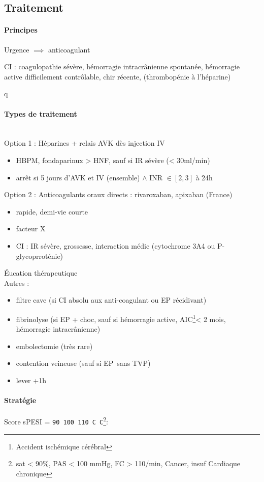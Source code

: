 \documentclass{article}
\begin{document}
\subsection{Traitement}
\paragraph{Principes}
Urgence \skull $\implies$ anticoagulant

CI : coagulopathie sévère, hémorragie intracrânienne spontanée, hémorragie
active difficilement contrôlable, chir récente, (thrombopénie à l'héparine)

q\paragraph{Types de traitement}\mbox{}\\
Option 1 : Héparines + relais AVK dès injection IV
\begin{itemize}
\item HBPM, fondaparinux > HNF, sauf si IR sévère (< 30ml/min)
\item arrêt si 5 jours d'AVK et IV (ensemble) $\wedge$ INR $\in [2,3]$ à 24h
\end{itemize}
Option 2 : Anticoagulants oraux directs : rivaroxaban, apixaban (France)
\begin{itemize}
\item rapide, demi-vie courte
\item facteur X
\item CI : IR sévère, grossesse, interaction médic (cytochrome 3A4 ou
  P-glycoprroténie)
\end{itemize}
Éucation thérapeutique\\
Autres :
\begin{itemize}
\item filtre cave (si CI absolu aux anti-coagulant ou EP récidivant)
\item fibrinolyse (si EP + choc, sauf si hémorragie active,
  AIC\footnote{Accident ischémique cérébral}< 2 mois,
  hémorragie intracrânienne)
\item embolectomie (très rare)
\item contention veineuse (sauf si EP sans TVP)
\item lever +1h
\end{itemize}

\paragraph{Stratégie}
Score sPESI = \texttt{90 100 110 C C}\footnote{sat < 90\%, PAS < 100 mmHg, FC >
110/min, Cancer, insuf Cardiaque chronique}:
\end{document}
